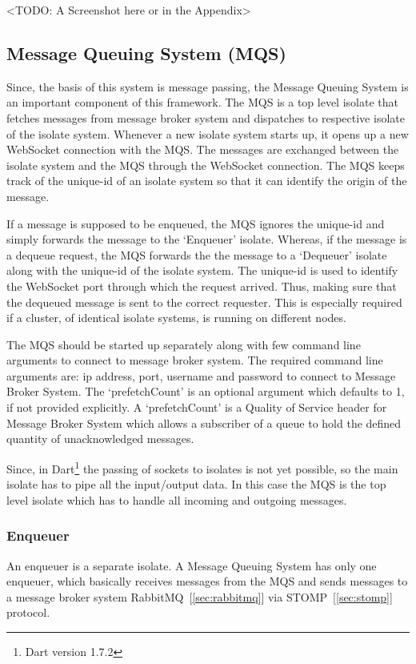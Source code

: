   <TODO: A Screenshot here or in the Appendix>

\subsection{Message Queuing System (MQS)}
  Since, the basis of this system is message passing, the Message Queuing System is an important component of this framework. The MQS is a top level isolate that fetches messages from message broker system and dispatches to respective isolate of the isolate system. Whenever a new isolate system starts up, it opens up a new WebSocket connection with the MQS. The messages are exchanged between the isolate system and the MQS through the WebSocket connection. The MQS keeps track of the unique-id of an isolate system so that it can identify the origin of the message.

  If a message is supposed to be enqueued, the MQS ignores the unique-id and simply forwards the message to the ‘Enqueuer’ isolate. Whereas, if the message is a dequeue request, the MQS forwards the the message to a ‘Dequeuer’ isolate along with the unique-id of the isolate system. The unique-id is used to identify the WebSocket port through which the request arrived. Thus, making sure that the dequeued message is sent to the correct requester. This is especially required if a cluster, of identical isolate systems, is running on different nodes.

  The MQS should be started up separately along with few command line arguments to connect to message broker system. The required command line arguments are: ip address, port, username and password to connect to Message Broker System. The ‘prefetchCount’ is an optional argument which defaults to 1, if not provided explicitly. A ‘prefetchCount’ is a Quality of Service header for Message Broker System which allows a subscriber of a queue to hold the defined quantity of unacknowledged messages.

Since, in Dart\footnote{Dart version 1.7.2} the passing of sockets to isolates is not yet possible, so the main isolate has to pipe all the input/output data. In this case the MQS is the top level isolate which has to handle all incoming and outgoing messages.

  \subsubsection{Enqueuer}
  An enqueuer is a separate isolate. A Message Queuing System has only one enqueuer, which basically receives messages from the MQS and sends messages to a message broker system \textendash{} RabbitMQ~[\ref{sec:rabbitmq}] via STOMP~[\ref{sec:stomp}] protocol.

